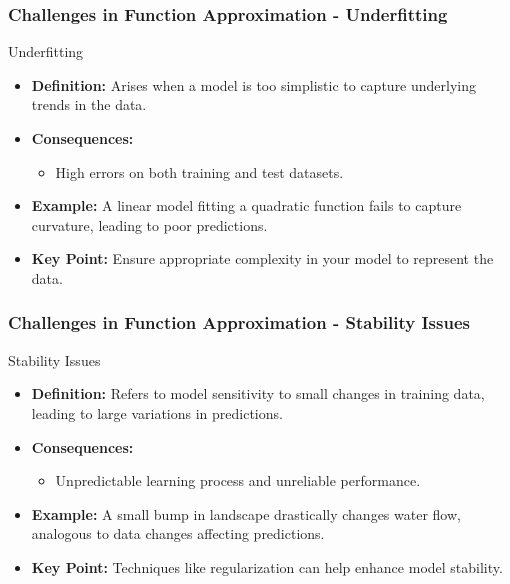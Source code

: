 \documentclass[aspectratio=169]{beamer}
\begin{document}
\begin{frame}[fragile]
    \frametitle{Challenges in Function Approximation - Underfitting}
    \begin{block}{Underfitting}
        \begin{itemize}
            \item \textbf{Definition:} Arises when a model is too simplistic to capture underlying trends in the data.
            \item \textbf{Consequences:} 
            \begin{itemize}
                \item High errors on both training and test datasets.
            \end{itemize}
            \item \textbf{Example:} A linear model fitting a quadratic function fails to capture curvature, leading to poor predictions.
            \item \textbf{Key Point:} Ensure appropriate complexity in your model to represent the data.
        \end{itemize}
    \end{block}
\end{frame}

\begin{frame}[fragile]
    \frametitle{Challenges in Function Approximation - Stability Issues}
    \begin{block}{Stability Issues}
        \begin{itemize}
            \item \textbf{Definition:} Refers to model sensitivity to small changes in training data, leading to large variations in predictions.
            \item \textbf{Consequences:} 
            \begin{itemize}
                \item Unpredictable learning process and unreliable performance.
            \end{itemize}
            \item \textbf{Example:} A small bump in landscape drastically changes water flow, analogous to data changes affecting predictions.
            \item \textbf{Key Point:} Techniques like regularization can help enhance model stability.
        \end{itemize}
    \end{block}
\end{frame}
\end{document}
